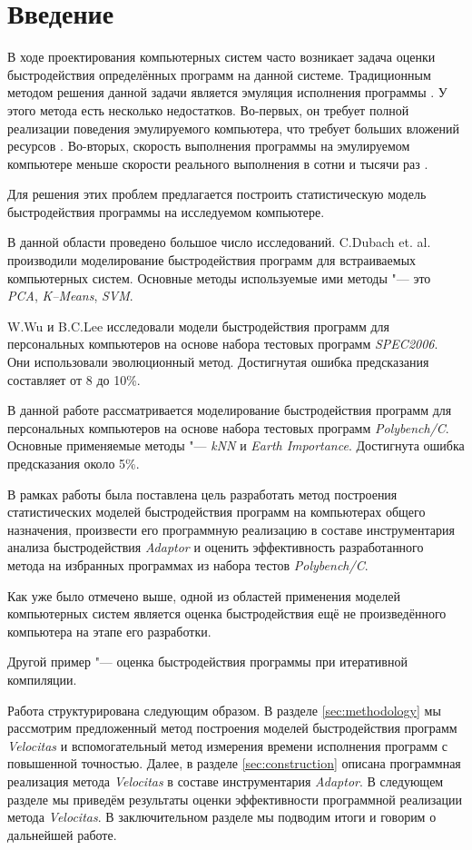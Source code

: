 \section*{Введение}
В ходе проектирования компьютерных систем часто возникает задача оценки быстродействия определённых программ на данной системе. Традиционным методом решения данной задачи является эмуляция исполнения программы \cite{emulation}. У этого метода есть несколько недостатков. Во-первых, он требует полной реализации поведения эмулируемого компьютера, что требует больших вложений ресурсов \cite{emulation-complexity}. Во-вторых, скорость выполнения программы на эмулируемом компьютере меньше скорости реального выполнения в сотни и тысячи раз \cite{emulation-speed}.

Для решения этих проблем предлагается построить статистическую модель быстродействия программы на исследуемом компьютере.

В данной области проведено большое число исследований. C.Dubach et. al. производили моделирование быстродействия программ для встраиваемых компьютерных систем. Основные методы используемые ими методы "--- это \textit{PCA}, \textit{K--Means}, \textit{SVM}.

W.Wu и B.C.Lee исследовали модели быстродействия программ для персональных компьютеров на основе набора тестовых программ \textit{SPEC2006}. Они использовали эволюционный метод. Достигнутая ошибка предсказания составляет от 8 до 10\%.

В данной работе рассматривается моделирование быстродействия программ для персональных компьютеров на основе набора тестовых программ \textit{Polybench/C}. Основные применяемые методы "--- \textit{kNN }и \textit{Earth Importance}. Достигнута ошибка предсказания около 5\%.

В рамках работы была поставлена цель разработать метод построения статистических моделей быстродействия программ на компьютерах общего назначения, произвести его программную реализацию в составе инструментария анализа быстродействия \textit{Adaptor} и оценить эффективность разработанного метода на избранных программах из набора тестов \textit{Polybench/C}.

Как уже было отмечено выше, одной из областей применения моделей компьютерных систем является оценка быстродействия ещё не произведённого компьютера на этапе его разработки.

Другой пример "--- оценка быстродействия программы при итеративной компиляции.

Работа структурирована следующим образом. В разделе \ref{sec:methodology} мы рассмотрим предложенный метод построения моделей быстродействия программ \textit{Velocitas} и вспомогательный метод измерения времени исполнения программ с повышенной точностью. Далее, в разделе \ref{sec:construction} описана программная реализация метода \textit{Velocitas} в составе инструментария \textit{Adaptor}. В следующем разделе мы приведём результаты оценки эффективности программной реализации метода \textit{Velocitas}. В заключительном разделе мы подводим итоги и говорим о дальнейшей работе.
